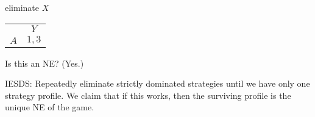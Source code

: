 \documentclass[12pt,letterpaper]{report}
\begin{document}
\begin{ex}
  \hspace{0.20\textwidth} \scalebox{2}{$\downarrow$} \quad eliminate $X$

  \begin{minipage}{0.4\textwidth}
    \centering
    \renewcommand{\arraystretch}{1.25}
    \begin{tabular}{c |c|}
      \multicolumn{1}{c}{} & \multicolumn{1}{c}{$Y$} \\
      \cline{2-2}
      $A$ & $1, 3$ \\
      \cline{2-2}
    \end{tabular}
  \end{minipage}\hfill\begin{minipage}{0.6\textwidth}
    Is this an NE?
    (Yes.)
  \end{minipage}
\end{ex}

IESDS: Repeatedly eliminate strictly dominated strategies until we have only one strategy profile.
We claim that if this works, then the surviving profile is the unique NE of the game.
\end{document}
